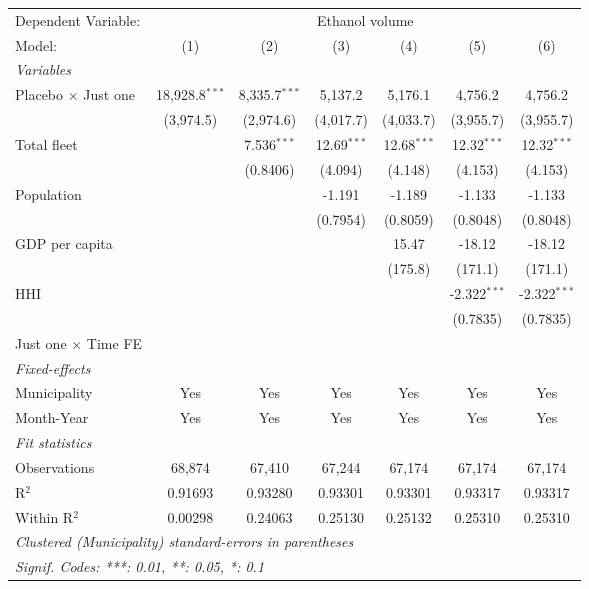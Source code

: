 \documentclass[
]{article}
\begin{document}
\begin{tabular}{lcccccc}
\tabularnewline\midrule\midrule
Dependent Variable:&\multicolumn{6}{c}{Ethanol volume}\\
Model:&(1) & (2) & (3) & (4) & (5) & (6)\\
\midrule \emph{Variables}&   &   &   &   &   &  \\
Placebo $\times $ Just one & 18,928.8$^{***}$ & 8,335.7$^{***}$ & 5,137.2 & 5,176.1 & 4,756.2 & 4,756.2\\
  &(3,974.5) & (2,974.6) & (4,017.7) & (4,033.7) & (3,955.7) & (3,955.7)\\
Total fleet &    & 7.536$^{***}$ & 12.69$^{***}$ & 12.68$^{***}$ & 12.32$^{***}$ & 12.32$^{***}$\\
  &   & (0.8406) & (4.094) & (4.148) & (4.153) & (4.153)\\
Population &    &    & -1.191 & -1.189 & -1.133 & -1.133\\
  &   &    & (0.7954) & (0.8059) & (0.8048) & (0.8048)\\
GDP per capita &    &    &    & 15.47 & -18.12 & -18.12\\
  &   &    &    & (175.8) & (171.1) & (171.1)\\
HHI &    &    &    &    & -2.322$^{***}$ & -2.322$^{***}$\\
  &   &    &    &    & (0.7835) & (0.7835)\\
Just one $\times$ Time FE &  &  &  &  &  & \\
\midrule \emph{Fixed-effects}&   &   &   &   &   &  \\
Municipality & Yes & Yes & Yes & Yes & Yes & Yes\\
Month-Year & Yes & Yes & Yes & Yes & Yes & Yes\\
\midrule \emph{Fit statistics}&  & & & & & \\
Observations & 68,874&67,410&67,244&67,174&67,174&67,174\\
R$^2$ & 0.91693&0.93280&0.93301&0.93301&0.93317&0.93317\\
Within R$^2$ & 0.00298&0.24063&0.25130&0.25132&0.25310&0.25310\\
\midrule\midrule\multicolumn{7}{l}{\emph{Clustered (Municipality) standard-errors in parentheses}}\\
\multicolumn{7}{l}{\emph{Signif. Codes: ***: 0.01, **: 0.05, *: 0.1}}\\
\end{tabular}
\end{document}
